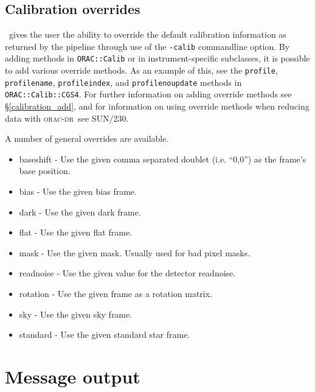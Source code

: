 \documentclass[twoside,11pt]{article}
\renewcommand{\_}{\texttt{\symbol{95}}}
\newcommand{\Oracdr}{\textsc{orac-dr}}
\begin{document}
\subsection{Calibration overrides}

\ORACDR\ gives the user the ability to override the default calibration
information as returned by the pipeline through use of the \texttt{-calib}
commandline option. By adding methods in \texttt{ORAC::Calib} or in
instrument-specific subclasses, it is possible to add various override
methods. As an example of this, see the \texttt{profile}, \texttt{profilename},
\texttt{profileindex}, and \texttt{profilenoupdate} methods in
\texttt{ORAC::Calib::CGS4}. For further information on adding override
methods see \S\ref{calibration_add}, and for information on using
override methods when reducing data with \Oracdr\ see SUN/230.

A number of general overrides are available. 

\begin{itemize}

\item baseshift - Use the given comma separated doublet (i.e. ``0,0'') as the
frame's base position.

\item bias - Use the given bias frame.

\item dark - Use the given dark frame.

\item flat - Use the given flat frame.

\item mask - Use the given mask. Usually used for bad pixel masks.

\item readnoise - Use the given value for the detector readnoise.

\item rotation - Use the given frame as a rotation matrix.

\item sky - Use the given sky frame.

\item standard - Use the given standard star frame.

\end{itemize}

\section{Message output}
\end{document}
